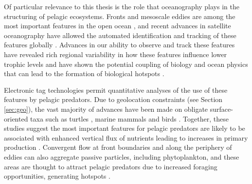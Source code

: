 Of particular relevance to this thesis is the role that oceanography plays in the structuring of pelagic ecosystems. Fronts and mesoscale eddies are among the most important features in the open ocean \citep{Chelton2011, McGillicuddy2016, Mahadevan2016}, and recent advances in satellite oceanography have allowed the automated identification and tracking of these features globally \citep{Chelton2011, Belkin2009}. Advances in our ability to observe and track these features have revealed rich regional variability in how these features influence lower trophic levels \citep{McGillicuddy2016, Gaube2017DSR} and have shown the potential coupling of biology and ocean physics that can lead to the formation of biological hotspots \citep{Mann2006, Belkin2014}.


Electronic tag technologies permit quantitative analyses of the use of these features by pelagic predators. Due to geolocation constraints (see Section \ref{sec:geo}), the vast majority of advances have been made on obligate surface-oriented taxa such as turtles \citep[\eg][]{Gaube2017, Polovina2006, Kobayashi2011}, marine mammals \citep[\eg][]{Johnston2007, Bailleul2010} and birds \citep[\eg][]{Thorne2013, TewKai2009}. Together, these studies suggest the most important features for pelagic predators are likely to be associated with enhanced vertical flux of nutrients leading to increases in primary production \citep{Franks1992}. Convergent flow at front boundaries and along the periphery of eddies can also aggregate passive particles, including phytoplankton, and these areas are thought to attract pelagic predators due to increased foraging opportunities, generating hotspots \citep{Scales2014}.


